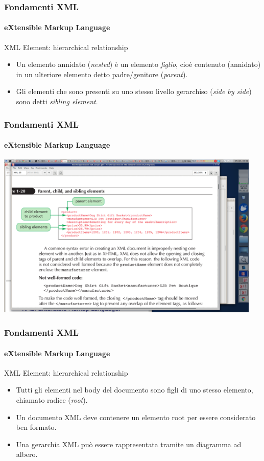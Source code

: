\begin{frame}
    \frametitle{Fondamenti XML}
    \framesubtitle{eXtensible Markup Language}
    \addtocounter{nframe}{1}

	\begin{block}{XML Element: hierarchical relationship}
		\begin{itemize}
			\item Un elemento annidato (\textit{nested}) è un elemento \textit{figlio}, cioè contenuto (annidato) in un ulteriore elemento detto padre/genitore (\textit{parent}).
			\item Gli elementi che sono presenti su uno stesso livello gerarchiso (\textit{side by side}) sono detti \textit{sibling element}.
		\end{itemize}
	\end{block}

\end{frame}

\begin{frame}
	\frametitle{Fondamenti XML}
	\framesubtitle{eXtensible Markup Language}
	\addtocounter{nframe}{1}
	\begin{center}
		\includegraphics[width=0.95\textwidth]{imgs/XML-Parent-Child-Sibling.png}
	\end{center}

\end{frame}

\begin{frame}
    \frametitle{Fondamenti XML}
    \framesubtitle{eXtensible Markup Language}
    \addtocounter{nframe}{1}

	\begin{block}{XML Element: hierarchical relationship}
		\begin{itemize}
			\item Tutti gli elementi nel body del documento sono figli di uno stesso elemento, chiamato radice (\textit{root}).
			\item Un documento XML deve contenere un elemento root per essere considerato ben formato.
			\item Una gerarchia XML può essere rappresentata tramite un diagramma ad albero.
		\end{itemize}
	\end{block}

\end{frame}

